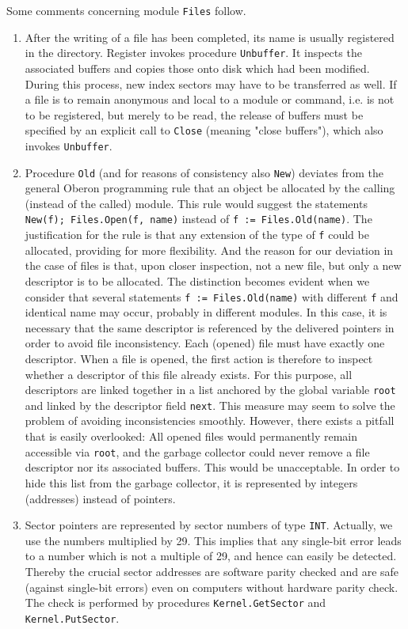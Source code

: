 Some comments concerning module \verb|Files| follow.
\begin{enumerate}
  \item After the writing of a file has been completed, its name is usually registered in the directory.
    Register invokes procedure \verb|Unbuffer|. It inspects the associated buffers and copies those onto
    disk which had been modified. During this process, new index sectors may have to be transferred
    as well. If a file is to remain anonymous and local to a module or command, i.e. is not to be
    registered, but merely to be read, the release of buffers must be specified by an explicit call to
    \verb|Close| (meaning "close buffers"), which also invokes \verb|Unbuffer|.
  \item Procedure \verb|Old| (and for reasons of consistency also \verb|New|) deviates from the general
    Oberon programming rule that an object be allocated by the calling (instead of the called) module.
    This rule would suggest the statements \verb|New(f); Files.Open(f, name)| instead of
    \verb|f := Files.Old(name)|. The justification for the rule is that any extension of the type of
    \verb|f| could be allocated, providing for more flexibility. And the reason for our deviation in the
    case of files is that, upon closer inspection, not a new file, but only a new descriptor is to be
    allocated.  The distinction becomes evident when we consider that several statements
    \verb|f := Files.Old(name)| with different \verb|f| and identical name may occur, probably in
    different modules. In this case, it is necessary that the same descriptor is referenced by the
    delivered pointers in order to avoid file inconsistency. Each (opened) file must have exactly one
    descriptor. When a file is opened, the first action is therefore to inspect whether a descriptor of
    this file already exists. For this purpose, all descriptors are linked together in a list anchored
    by the global variable \verb|root| and linked by the descriptor field \verb|next|. This measure may
    seem to solve the problem of avoiding inconsistencies smoothly. However, there exists a pitfall that
    is easily overlooked: All opened files would permanently remain accessible via \verb|root|, and the
    garbage collector could never remove a file descriptor nor its associated buffers. This would be
    unacceptable. In order to hide this list from the garbage collector, it is represented by integers
    (addresses) instead of pointers.
  \item Sector pointers are represented by sector numbers of type \verb|INT|. Actually, we use the
    numbers multiplied by 29. This implies that any single-bit error leads to a number which is not a
    multiple of 29, and hence can easily be detected. Thereby the crucial sector addresses are
    software parity checked and are safe (against single-bit errors) even on computers without hardware
    parity check. The check is performed by procedures \verb|Kernel.GetSector| and
    \verb|Kernel.PutSector|.
\end{enumerate}
